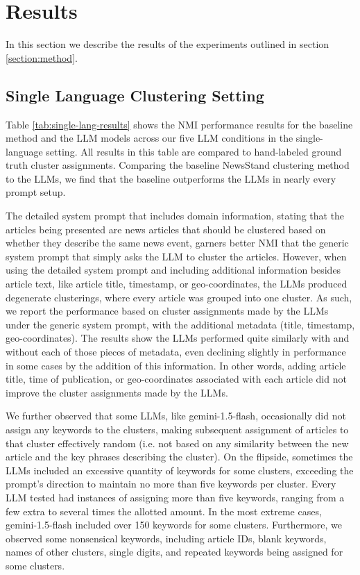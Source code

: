 \section{Results}\label{section:results}

In this section we describe the results of the experiments outlined in section \ref{section:method}.

\subsection{Single Language Clustering Setting}

Table \ref{tab:single-lang-results} shows the NMI performance results for the baseline method and the LLM models across our five LLM conditions in the single-language setting. 
All results in this table are compared to hand-labeled ground truth cluster assignments.
Comparing the baseline NewsStand clustering method to the LLMs, we find that the baseline outperforms the LLMs in nearly every prompt setup.

The detailed system prompt that includes domain information, stating that the articles being presented are news articles that should be clustered based on whether they describe the same news event, garners better \ac{NMI} that the generic system prompt that simply asks the LLM to cluster the articles.
However, when using the detailed system prompt and including additional information besides article text, like article title, timestamp, or geo-coordinates, the LLMs produced degenerate clusterings, where every article was grouped into one cluster.
As such, we report the performance based on cluster assignments made by the LLMs under the generic system prompt, with the additional metadata (title, timestamp, geo-coordinates).
The results show the LLMs performed quite similarly with and without each of those pieces of metadata, even declining slightly in performance in some cases by the addition of this information.
In other words, adding article title, time of publication, or geo-coordinates associated with each article did not improve the cluster assignments made by the LLMs. 

We further observed that some LLMs, like gemini-1.5-flash, occasionally did not assign any keywords to the clusters, making subsequent assignment of articles to that cluster effectively random (i.e. not based on any similarity between the new article and the key phrases describing the cluster).
On the flipside, sometimes the LLMs included an excessive quantity of keywords for some clusters, exceeding the prompt's direction to maintain no more than five keywords per cluster.
Every LLM tested had instances of assigning more than five keywords, ranging from a few extra to several times the allotted amount. 
In the most extreme cases, gemini-1.5-flash included over 150 keywords for some clusters. 
Furthermore, we observed some nonsensical keywords, including article IDs, blank keywords, names of other clusters, single digits, and repeated keywords being assigned for some clusters.


